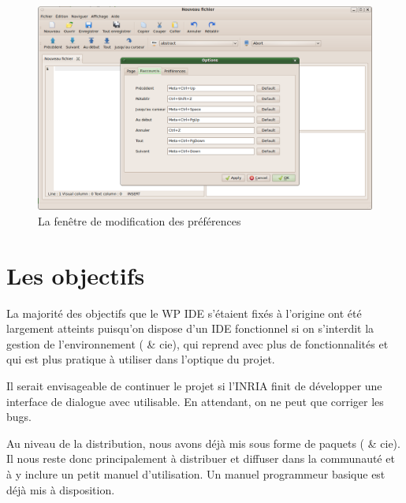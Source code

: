         \begin{figure}[ht]
            \centering
            \includegraphics[scale=0.3]{../images/ide/settings.png}
            \caption{La fenêtre de modification des préférences}
            \label{fig:settings}
        \end{figure}

\section{Les objectifs}

La majorité des objectifs que le WP IDE s'étaient fixés à l'origine ont été largement atteints puisqu'on dispose d'un IDE fonctionnel si on s'interdit la gestion de l'environnement ( \& cie),  qui reprend \coqide{} avec plus de fonctionnalités et qui est plus pratique à utiliser dans l'optique du projet.

Il serait envisageable de continuer le projet si l'INRIA finit de développer une interface de dialogue avec \coq{} utilisable.
En attendant, on ne peut que corriger les bugs.

Au niveau de la distribution, nous avons déjà mis \coquille{} sous forme de paquets ( \& cie). Il nous reste donc principalement à distribuer et diffuser \coquille{} dans la communauté \coq{} et à y inclure un petit manuel d'utilisation. Un manuel programmeur basique est déjà mis à disposition.

